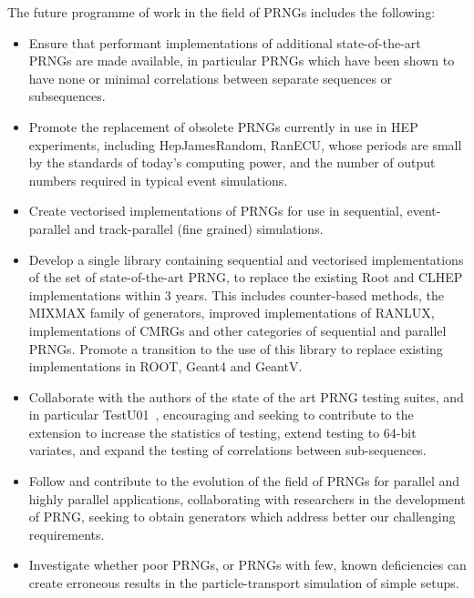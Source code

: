\documentclass[12pt,a4paper]{article}
\begin{document}
{The future programme of work in the field of PRNGs includes the
following:

\begin{itemize}
\item
  Ensure that performant implementations of additional state-of-the-art
  PRNGs are made available, in particular PRNGs which have been shown to
  have none or minimal correlations between separate sequences or
  subsequences.
\item
  Promote the replacement of obsolete PRNGs currently in use in HEP
  experiments, including HepJamesRandom, RanECU, whose periods are small
  by the standards of today's computing power, and the number of output
  numbers required in typical event simulations.
\item
  Create vectorised implementations of PRNGs for use in sequential,
  event-parallel and track-parallel (fine grained) simulations.
\item
  Develop a single library containing sequential and vectorised
  implementations of the set of state-of-the-art PRNG, to replace the
  existing Root and CLHEP implementations within 3 years. This includes
  counter-based methods, the MIXMAX family of generators, improved
  implementations of RANLUX, implementations of CMRGs and other
  categories of sequential and parallel PRNGs. Promote a transition to
  the use of this library to replace existing implementations in ROOT,
  Geant4 and GeantV.
\item
  Collaborate with the authors of the state of the art PRNG testing
  suites, and in particular TestU01~\cite{Ecuyer:2007:TCL:1268776.1268777}, 
  encouraging and seeking to contribute to the extension to increase 
  the statistics of testing, extend testing to 64-bit variates, 
  and expand the testing of correlations between sub-sequences.
\item
  Follow and contribute to the evolution of the field of PRNGs for
  parallel and highly parallel applications, collaborating with
  researchers in the development of PRNG, seeking to obtain generators
  which address better our challenging requirements.
\end{itemize}

\begin{itemize}
\item
  Investigate whether poor PRNGs, or PRNGs with few, known deficiencies
  can create erroneous results in the particle-transport simulation of
  simple setups.
\end{itemize}

}
\end{document}
